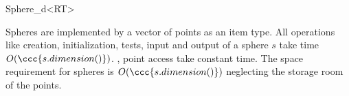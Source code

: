 \begin{ccRefClass}{Sphere_d<RT>}




\ccImplementation

Spheres are implemented by a vector of points as
an item type.  All operations like creation, initialization, tests,
input and output of a sphere $s$ take time
$O(\ccc{s.dimension()})$. , point access take constant time.
The space requirement for spheres is $O(\ccc{s.dimension()})$ 
neglecting the storage room of the points. 



\end{ccRefClass}


